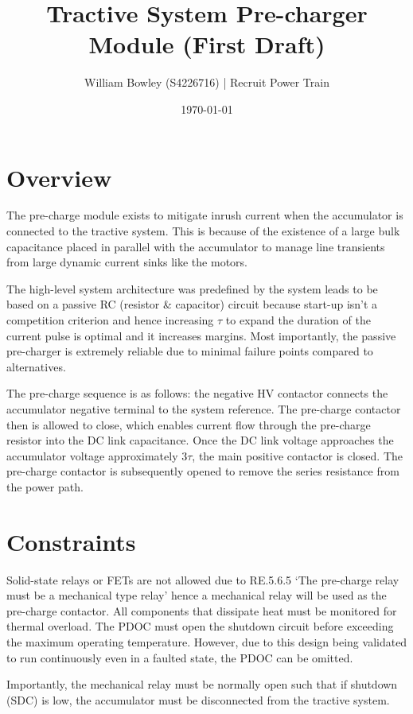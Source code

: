 \documentclass{article}
\title{Tractive System Pre-charger Module (First Draft)}
\author{William Bowley (S4226716) | Recruit Power Train}
\date{\today}
\begin{document}
\maketitle

\section{Overview}
The pre-charge module exists to mitigate inrush current when the accumulator is connected to the 
tractive system. This is because of the existence of a large bulk capacitance placed in parallel 
with the accumulator to manage line transients from large dynamic current sinks like the motors.

\vspace{0.5cm}
The high-level system architecture was predefined by the system leads to be based on a passive RC 
(resistor \& capacitor) circuit because start-up isn't a competition criterion and hence increasing 
$\tau$ to expand the duration of the current pulse is optimal and it increases margins. Most importantly, 
the passive pre-charger is extremely reliable due to minimal failure points compared to alternatives.


\vspace{0.5cm}
The pre-charge sequence is as follows: the negative HV contactor connects the accumulator negative terminal to the
system reference. The pre-charge contactor then is allowed to close, which enables current flow through the 
pre-charge resistor into the DC link capacitance. Once the DC link voltage approaches the accumulator voltage
approximately 3$\tau$, the main positive contactor is closed. The pre-charge contactor is subsequently opened
to remove the series resistance from the power path. 

\section{Constraints}

Solid-state relays or FETs are not allowed due to RE.5.6.5 `The pre-charge relay must be a mechanical type relay'
hence a mechanical relay will be used as the pre-charge contactor. All components that dissipate heat must be 
monitored for thermal overload. The PDOC must open the shutdown circuit before exceeding the maximum operating temperature.
However, due to this design being validated to run continuously even in a faulted state, the PDOC can be omitted.

\vspace{0.5cm}
Importantly, the mechanical relay must be normally open such that if shutdown (SDC) is low, the accumulator must be disconnected
from the tractive system. 
\end{document}
